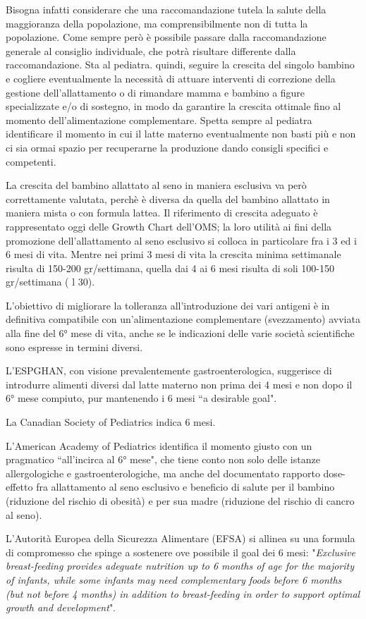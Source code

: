 \documentclass[]{article}
\begin{document}
Bisogna infatti considerare che una raccomandazione tutela la salute
della maggioranza della popolazione, ma comprensibilmente non di tutta
la popolazione. Come sempre però è possibile passare dalla
raccomandazione generale al consiglio individuale, che potrà risultare
differente dalla raccomandazione. Sta al pediatra. quindi, seguire la
crescita del singolo bambino e cogliere eventualmente la necessità di
attuare interventi di correzione della gestione dell'allattamento o di
rimandare mamma e bambino a figure specializzate e/o di sostegno, in
modo da garantire la crescita ottimale fino al momento
dell'alimentazione complementare. Spetta sempre al pediatra identificare
il momento in cui il latte materno eventualmente non basti più e non ci
sia ormai spazio per recuperarne la produzione dando consigli specifici
e competenti.

La crescita del bambino allattato al seno in maniera esclusiva va però
correttamente valutata, perchè è diversa da quella del bambino allattato
in maniera mista o con formula lattea. Il riferimento di crescita
adeguato è rappresentato oggi delle Growth Chart dell'OMS; la loro
utilità ai fini della promozione dell'allattamento al seno esclusivo si
colloca in particolare fra i 3 ed i 6 mesi di vita. Mentre nei primi 3
mesi di vita la crescita minima settimanale risulta di 150-200
gr/settimana, quella dai 4 ai 6 mesi risulta di soli 100-150
gr/settimana ( l 30).

L'obiettivo di migliorare la tolleranza all'introduzione dei vari
antigeni è in definitiva compatibile con un'alimentazione complementare
(svezzamento) avviata alla fine del 6° mese di vita, anche se le
indicazioni delle varie società scientifiche sono espresse in termini
diversi.

L'ESPGHAN, con visione prevalentemente gastroenterologica, suggerisce di
introdurre alimenti diversi dal latte materno non prima dei 4 mesi e non
dopo il 6° mese compiuto, pur mantenendo i 6 mesi ``a desirable goal".

La Canadian Society of Pediatrics indica 6 mesi.

L'American Academy of Pediatrics identifica il momento giusto con un
pragmatico ``all'incirca al 6° mese", che tiene conto non solo delle
istanze allergologiche e gastroenterologiche, ma anche del documentato
rapporto dose-effetto fra allattamento al seno esclusivo e beneficio di
salute per il bambino (riduzione del rischio di obesità) e per sua madre
(riduzione del rischio di cancro al seno).

L'Autorità Europea della Sicurezza Alimentare (EFSA) si allinea su una
formula di compromesso che spinge a sostenere ove possibile il goal dei
6 mesi: "\emph{Exclusive breast-feeding provides adeguate nutrition up
to 6 months of age for the majority of infants, while some infants may
need complementary foods before 6 months (but not before 4 months) in
addition to breast-feeding in order to support optimal growth and
development}".
\end{document}
